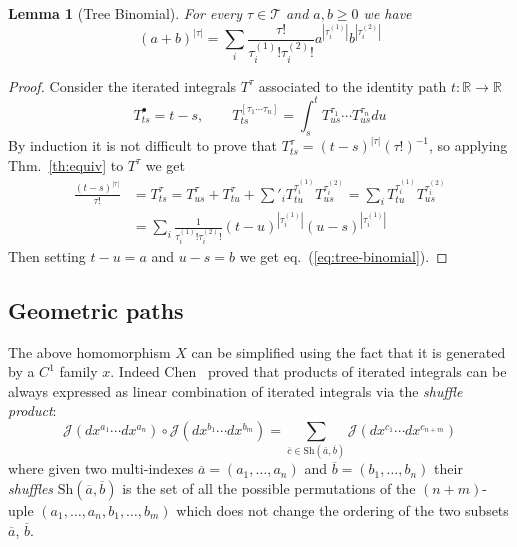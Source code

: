 \documentclass[a4paper,11pt,reqno]{article}
\newcommand{\1}{{\bf 1}}
\newcommand{\RR}{\mathbb{R}}
\newcommand{\cj}{\mathcal J}
\newtheorem{lemma}[theorem]{Lemma}
\newcommand{\TT}{\mathcal{T}}
\newcommand{\troot}{\bullet}
\begin{document}
\begin{lemma}[Tree Binomial]
\label{lemma:tree-binomial}
For every $\tau \in \TT$ and $a,b \ge 0$ we have
\begin{equation}
  \label{eq:tree-binomial}
  (a+b)^{|\tau|} = \sum_i \frac{\tau!}{\tau^{(1)}_i! \tau^{(2)}_i!} a^{|\tau^{(1)}_i|} b^{|\tau^{(2)}_i|}
\end{equation}
\end{lemma}
\begin{proof}
Consider the iterated integrals $T^\tau$ associated to the identity path $t : \RR \to \RR$
$$
T^{\troot}_{ts} = t-s, \qquad T^{[\tau_1 \cdots \tau_n]}_{ts} = \int_s^t T^{\tau_1}_{us}\cdots T^{\tau_n}_{us} du
$$  
By induction it is not difficult to prove that
$
T^{\tau}_{ts} = (t-s)^{|\tau|} (\tau!)^{-1}
$, so applying Thm.~\ref{th:equiv} to $T^\tau$ we get
\begin{equation*}
  \begin{split}
\frac{(t-s)^{|\tau|}}{\tau!} & = T^{\tau}_{ts}  = T^{\tau}_{us} + T^{\tau}_{tu} + \sum'_i T^{\tau^{(1)}_i}_{tu} T^{\tau^{(2)}_i}_{us}
= \sum_i T^{\tau^{(1)}_i}_{tu} T^{\tau^{(2)}_i}_{us}    
  \\ & = \sum_i \frac{1}{\tau^{(1)}_i! \tau^{(2)}_i!} (t-u)^{|\tau^{(1)}_i|} (u-s)^{|\tau^{(1)}_i|}
  \end{split}
\end{equation*}
Then setting $t-u = a$ and $u-s=b$ we get eq.~(\ref{eq:tree-binomial}).
\end{proof}

\subsection{Geometric paths}
The above homomorphism $X$ can be simplified using the fact that it is generated by a $C^1$ family $x$. Indeed Chen~\cite{MR0454968} proved that products of iterated integrals can be always expressed as linear combination of iterated integrals via the \emph{shuffle product}:
\begin{equation}
  \label{eq:shuffle}
\cj(dx^{a_1}\cdots dx^{a_n})\circ \cj(dx^{b_1}\cdots dx^{b_m}) = \sum_{\overline c \in \text{Sh}(\overline a, \overline b)} \cj(dx^{c_1}\cdots dx^{c_{n+m}})  
\end{equation}
where given two multi-indexes $\overline a = (a_1,\dots,a_n)$ and $\overline b = (b_1,\dots,b_n)$ their \emph{shuffles} $\text{Sh}(\overline a, \overline b)$ is the set of all the possible permutations of the $(n+m)$-uple $(a_1,\dots,a_n,b_1,\dots,b_m)$ which does not change the ordering of the two subsets $\overline a$, $\overline b$.
\end{document}
